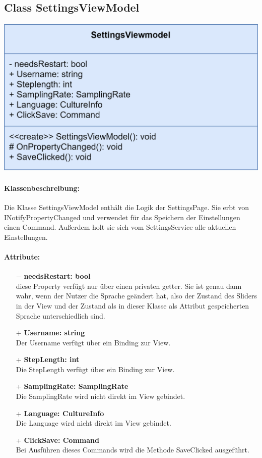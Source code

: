 \documentclass[a4paper,12pt]{article}
\begin{document}
\begin{minipage}[b]{0.7\textwidth}

	\subsection{Class SettingsViewModel}
\end{minipage}
\begin{minipage}[c]{0.3\textwidth}
	\includegraphics[width=\textwidth]{bilder/ViewmodelKlassen/SettingsViewModel.png}
\end{minipage}
\paragraph{Klassenbeschreibung:}
Die Klasse SettingsViewModel enthält die Logik der SettingsPage. Sie erbt von INotifyPropertyChanged und verwendet für das Speichern der Einstellungen einen Command. Außerdem holt sie sich vom SettingsService alle aktuellen Einstellungen.
\paragraph{Attribute:}
\begin{itemize}
	\item[$-$] \textbf{needsRestart: bool}\\ diese Property verfügt nur über einen privaten getter. Sie ist genau dann wahr, wenn der Nutzer die Sprache geändert hat, also der Zustand des Sliders in der View und der Zustand als in dieser Klasse als Attribut gespeicherten Sprache unterschiedlich sind.
	\item[+] \textbf{Username: string}\\Der Username verfügt über ein Binding zur View.
	\item[+] \textbf{StepLength: int}\\Die StepLength verfügt über ein Binding zur View. 
	\item[+] \textbf{SamplingRate: SamplingRate}\\Die SamplingRate wird nicht direkt im View gebindet.
	\item[+] \textbf{Language: CultureInfo}\\Die Language wird nicht direkt im View gebindet. 
	\item[+] \textbf{ClickSave: Command}\\Bei Ausführen dieses Commands wird die Methode SaveClicked ausgeführt. 
\end{itemize}
\end{document}
